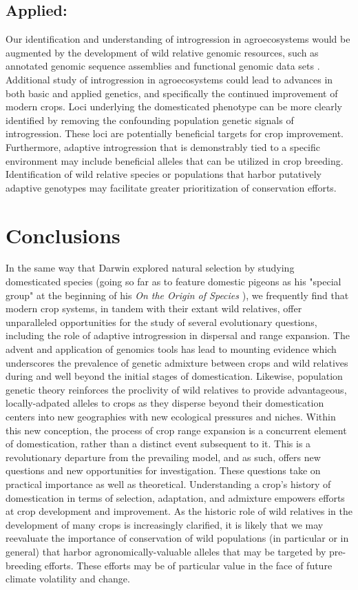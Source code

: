 \documentclass[11pt]{article}
\begin{document}
\subsection*{Applied:}
Our identification and understanding of introgression in agroecosystems would be augmented by the development of wild relative genomic resources, such as annotated genomic sequence assemblies and functional genomic data sets \cite{Huang2012}.
Additional study of introgression in agroecosystems could lead to advances in both basic and applied genetics, and specifically the continued improvement of modern crops.
Loci underlying the domesticated phenotype can be more clearly identified by removing the confounding population genetic signals of introgression.
These loci are potentially beneficial targets for crop improvement.
Furthermore, adaptive introgression that is demonstrably tied to a specific environment may include beneficial alleles that can be utilized in crop breeding.
Identification of wild relative species or populations that harbor putatively adaptive genotypes may facilitate greater prioritization of conservation efforts.


\section*{Conclusions}

In the same way that Darwin explored natural selection by studying domesticated species (going so far as to feature domestic pigeons as his "special group" at the beginning of his 
\emph{On the Origin of Species} \cite{darwin2009origin}), we frequently find that modern crop systems, in tandem with their extant wild relatives, offer unparalleled opportunities for the study of several evolutionary questions, including the role of adaptive introgression in dispersal and range expansion.
The advent and application of genomics tools has lead to mounting evidence which underscores the prevalence of genetic admixture between crops and wild relatives during and well beyond the initial stages of domestication.
Likewise, population genetic theory reinforces the proclivity of wild relatives to provide advantageous, locally-adpated alleles to crops as they disperse beyond their domestication centers into new geographies with new ecological pressures and niches.
Within this new conception, the process of crop range expansion is a concurrent element of domestication, rather than a distinct event subsequent to it.
This is a revolutionary departure from the prevailing model, and as such, offers new questions and new opportunities for investigation.
These questions take on practical importance as well as theoretical.
Understanding a crop's history of domestication in terms of selection, adaptation, and admixture empowers efforts at crop development and improvement.
As the historic role of wild relatives in the development of many crops is increasingly clarified, it is likely that we may reevaluate the importance of conservation of wild populations (in particular or in general) that harbor agronomically-valuable alleles that may be targeted by pre-breeding efforts.
These efforts may be of particular value in the face of future climate volatility and change.
\end{document}
